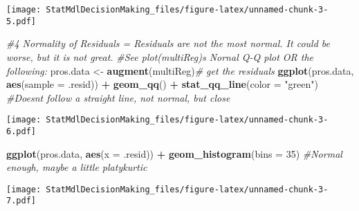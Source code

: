 \documentclass[
]{article}
\newenvironment{Shaded}{\begin{snugshade}}{\end{snugshade}}
\newcommand{\AttributeTok}[1]{\textcolor[rgb]{0.13,0.29,0.53}{#1}}
\newcommand{\CommentTok}[1]{\textcolor[rgb]{0.56,0.35,0.01}{\textit{#1}}}
\newcommand{\DecValTok}[1]{\textcolor[rgb]{0.00,0.00,0.81}{#1}}
\newcommand{\FunctionTok}[1]{\textcolor[rgb]{0.13,0.29,0.53}{\textbf{#1}}}
\newcommand{\NormalTok}[1]{#1}
\newcommand{\OtherTok}[1]{\textcolor[rgb]{0.56,0.35,0.01}{#1}}
\newcommand{\SpecialCharTok}[1]{\textcolor[rgb]{0.81,0.36,0.00}{\textbf{#1}}}
\newcommand{\StringTok}[1]{\textcolor[rgb]{0.31,0.60,0.02}{#1}}
\begin{document}
\texttt{[image: StatMdlDecisionMaking\_files/figure-latex/unnamed-chunk-3-5.pdf]}

\begin{Shaded}
\begin{Highlighting}[]
    \CommentTok{\#4 Normality of Residuals = Residuals are not the most normal. It could be worse, but it is not great.}
      \CommentTok{\#See plot(multiReg)\textquotesingle{}s Nornal Q{-}Q plot OR the following: }
\NormalTok{      pros.data }\OtherTok{\textless{}{-}} \FunctionTok{augment}\NormalTok{(multiReg)}\CommentTok{\# get the residuals}
      \FunctionTok{ggplot}\NormalTok{(pros.data, }\FunctionTok{aes}\NormalTok{(}\AttributeTok{sample =}\NormalTok{ .resid)) }\SpecialCharTok{+}
\FunctionTok{geom\_qq}\NormalTok{() }\SpecialCharTok{+}
\FunctionTok{stat\_qq\_line}\NormalTok{(}\AttributeTok{color =} \StringTok{"green"}\NormalTok{) }\CommentTok{\#Doesn\textquotesingle{}t follow a straight line, not normal, but close}
\end{Highlighting}
\end{Shaded}

\texttt{[image: StatMdlDecisionMaking\_files/figure-latex/unnamed-chunk-3-6.pdf]}

\begin{Shaded}
\begin{Highlighting}[]
     \FunctionTok{ggplot}\NormalTok{(pros.data, }\FunctionTok{aes}\NormalTok{(}\AttributeTok{x =}\NormalTok{ .resid)) }\SpecialCharTok{+}
\FunctionTok{geom\_histogram}\NormalTok{(}\AttributeTok{bins =} \DecValTok{35}\NormalTok{) }\CommentTok{\#Normal enough, maybe a little platykurtic}
\end{Highlighting}
\end{Shaded}

\texttt{[image: StatMdlDecisionMaking\_files/figure-latex/unnamed-chunk-3-7.pdf]}

\begin{Shaded}
\end{Shaded}
\end{document}
